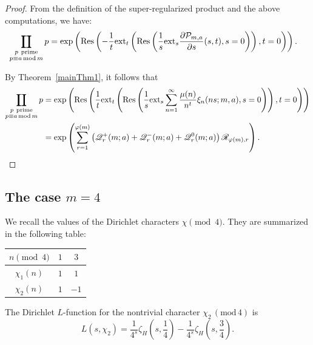 \documentclass[12pt]{amsart}
\DeclareMathOperator*\Rprod{%
\mathchoice
  {\ooalign{$\displaystyle\prod$\cr\hidewidth$\displaystyle\coprod$\hidewidth\cr}}%
  {\ooalign{$\textstyle\prod$\cr\hidewidth$\textstyle\coprod$\hidewidth\cr}}%
  {\ooalign{$\scriptstyle\prod$\cr\hidewidth$\scriptstyle\coprod$\hidewidth\cr}}%
  {\ooalign{$\scriptscriptstyle\prod$\cr\hidewidth$%
  \scriptscriptstyle\coprod$\hidewidth\cr}}}
\begin{document}
\begin{proof}
From the definition of the super-regularized product and the above computations, we have:
\begin{equation*}
\begin{split}
\Rprod_{\substack{p\ \text{prime} \\ p\equiv a\, \mathrm{mod}\, m}} p
&= \exp\left(
\mathrm{Res}\left(
-\frac{1}{t} \mathrm{ext}_t \left(
\mathrm{Res}\left(
\frac{1}{s} \mathrm{ext}_s \frac{\partial \mathcal{P}_{m,a}}{\partial s}(s,t), s=0
\right)
\right), t=0
\right)
\right).
\end{split}
\end{equation*}


By Theorem~\ref{mainThm1}, it follows that
\begin{equation*}
\begin{split}
\Rprod_{\substack{p\ \text{prime} \\ p\equiv a\, \mathrm{mod}\, m}} p
&= \exp\left(
\mathrm{Res}\left(
\frac{1}{t} \mathrm{ext}_t \left(
\mathrm{Res}\left(
\frac{1}{s} \mathrm{ext}_s \sum_{n=1}^\infty \frac{\mu(n)}{n^t} \xi_n(ns; m, a), s=0
\right)
\right), t=0
\right)
\right) \\
&= \exp\left(
\sum_{r=1}^{\varphi(m)} \left( \mathscr{Q}_r^+(m; a) + \mathscr{Q}_r^-(m; a) + \mathscr{Q}_r^0(m; a) \right) \mathscr{R}_{\varphi(m), r}
\right).
\end{split}
\end{equation*}
\end{proof}




\subsection{The case $m=4$} 
 

We recall the values of the Dirichlet characters $\chi \pmod{4}$. They are summarized in the following table:
\bigskip 

\begin{center}
\begin{tabular}{c|c|c}
\hline
$n \pmod{4}$ & $1$ & $3$ \\
\hline
$\chi_1(n)$ & $1$ & $1$ \\
$\chi_2(n)$ & $1$ & $-1$ \\
\hline
\end{tabular}
\end{center}
\bigskip

The Dirichlet $L$-function for the nontrivial character $\chi_2 \, (\mathrm{mod}\, 4)$ is
\[
L(s, \chi_2) = \frac{1}{4^s} \zeta_H\!\left(s, \frac{1}{4}\right) - \frac{1}{4^s} \zeta_H\!\left(s, \frac{3}{4}\right).
\]
\end{document}
